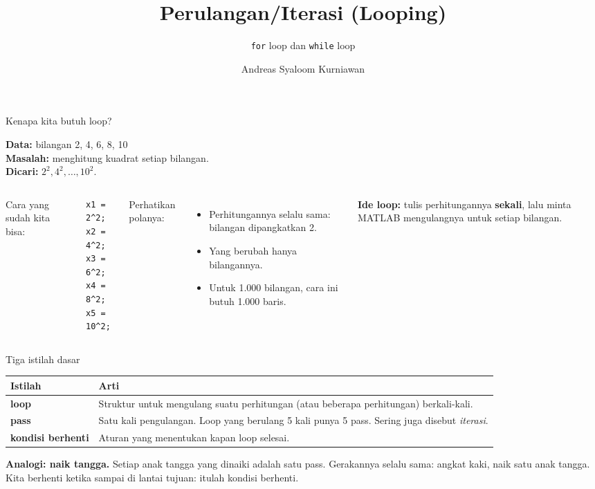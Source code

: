 \documentclass[aspectratio=169,11pt]{beamer}
\title{Perulangan/Iterasi (Looping)}
\subtitle{\texttt{for} loop dan \texttt{while} loop}
\author{Andreas Syaloom Kurniawan}
\institute{Faculty of Economics and Business, Universitas Gadjah Mada}
\date{}
\newcommand{\masalah}[3]{%
  \noindent\colorbox{kolom!8}{\parbox{\dimexpr\linewidth-2\fboxsep\relax}{%
    \footnotesize\textbf{Data:} #1\\[1pt]
    \textbf{Masalah:} #2\\[1pt]
    \textbf{Dicari:} #3}}\par\vspace{0.35em}}
\begin{document}
\maketitle

\begin{frame}[fragile]{Kenapa kita butuh loop?}
\masalah{bilangan 2, 4, 6, 8, 10}
  {menghitung kuadrat setiap bilangan.}
  {$2^2, 4^2, \dots, 10^2$.}
\begin{columns}[T]
\small Cara yang sudah kita bisa:
\begin{lstlisting}[basicstyle=\ttfamily\scriptsize]
x1 = 2^2;
x2 = 4^2;
x3 = 6^2;
x4 = 8^2;
x5 = 10^2;
\end{lstlisting}
\small Perhatikan polanya:
\begin{itemize}
  \item Perhitungannya \alert{selalu sama}: bilangan dipangkatkan 2.
  \item Yang berubah \alert{hanya bilangannya}.
  \item Untuk 1.000 bilangan, cara ini butuh 1.000 baris.
\end{itemize}
\textbf{Ide loop:} tulis perhitungannya \textbf{sekali}, lalu minta MATLAB
mengulangnya untuk setiap bilangan.
\end{columns}
\end{frame}

\begin{frame}{Tiga istilah dasar}
\small
\renewcommand{\arraystretch}{1.35}
\begin{tabular}{p{} p{}}
\toprule
Istilah & Arti \\
\midrule
\textbf{loop} & Struktur untuk mengulang suatu perhitungan (atau beberapa
  perhitungan) berkali-kali. \\
\textbf{pass} & Satu kali pengulangan. Loop yang berulang 5 kali punya
  5 pass. Sering juga disebut \emph{iterasi}. \\
\textbf{kondisi berhenti} & Aturan yang menentukan kapan loop selesai. \\
\bottomrule
\end{tabular}

\vspace{0.8em}
\textbf{Analogi: naik tangga.} Setiap anak tangga yang dinaiki adalah satu
\alert{pass}. Gerakannya selalu sama: angkat kaki, naik satu anak tangga. Kita
berhenti ketika sampai di lantai tujuan: itulah \alert{kondisi berhenti}.
\end{frame}
\end{document}
